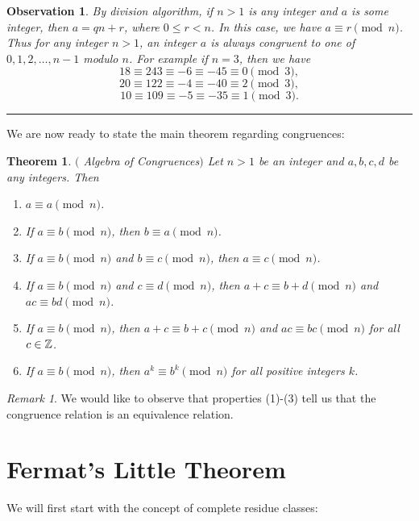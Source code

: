 \documentclass[12pt]{article}
\theoremstyle{plain}
\newtheorem{observation}{Observation}
\newtheorem{theorem}{Theorem}
\theoremstyle{definition}
\theoremstyle{remark}
\newtheorem{remark}{Remark}
\begin{document}
\bigskip
\begin{observation}
By division algorithm, if $n>1$ is any integer and $a$ is some integer, then $a=qn+r$, where $0\leq r <n$. In this case, we have $a\equiv r \pmod{n}$. Thus for any integer $n>1$, an integer $a$ is always congruent to one of $0, 1, 2, \dots, n-1$ modulo $n$.
For example if $n=3$, then we have
$$18\equiv 243\equiv -6 \equiv -45 \equiv 0 \pmod{3},$$
$$20\equiv 122\equiv -4 \equiv -40 \equiv 2 \pmod{3},$$
$$10\equiv 109\equiv -5 \equiv -35 \equiv 1 \pmod{3}.$$
\end{observation}
\hrule

\bigskip
\noindent
We are now ready to state the main theorem regarding congruences:
\begin{theorem}$($ Algebra of Congruences$)$
Let $n>1$ be an integer and $a, b, c, d$ be any integers. Then
\begin{enumerate}
    \item $a\equiv a \pmod{n}$.
    \item If $a\equiv b \pmod{n}$, then $b\equiv a \pmod{n}$.
    \item If $a\equiv b \pmod{n}$ and $b\equiv c \pmod{n}$, then $a\equiv c \pmod{n}$.
    \item If $a\equiv b \pmod{n}$ and $c\equiv d \pmod{n}$, then $a+c\equiv b+d \pmod{n}$ and $ac\equiv bd \pmod{n}$.
    \item If $a\equiv b \pmod{n}$, then $a+c\equiv b+c \pmod{n}$ and $ac\equiv bc \pmod{n}$ for all $c\in \mathbb{Z}$.
    \item If $a\equiv b \pmod{n}$, then $a^k \equiv b^k \pmod{n}$ for all positive integers $k$.
\end{enumerate}
\end{theorem}

\begin{remark}
We would like to observe that properties (1)-(3) tell us that the congruence relation is an equivalence relation.
\end{remark}

\section{Fermat's Little Theorem}
We will first start with the concept of complete residue classes:
\end{document}
